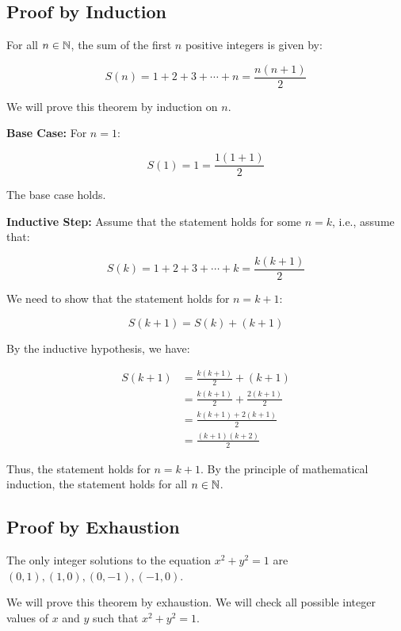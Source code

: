 \QED

\subsection{Proof by Induction}

For all \( n \in \mathbb{N} \), the sum of the first \(n\) positive integers is given by:

\[
	S(n) = 1 + 2 + 3 + \cdots + n = \frac{n(n+1)}{2}
\]

We will prove this theorem by induction on \(n\).
\vspace{\baselineskip}

\textbf{Base Case:} For \( n = 1 \):

\[
	S(1) = 1 = \frac{1(1+1)}{2}
\]

The base case holds.
\vspace{\baselineskip}

\textbf{Inductive Step:} Assume that the statement holds for some \( n = k \), i.e., assume that:
	
\[
	S(k) = 1 + 2 + 3 + \cdots + k = \frac{k(k+1)}{2}
\]
	
We need to show that the statement holds for \( n = k + 1 \):

\[
	S(k+1) = S(k) + (k + 1)
\]
	
By the inductive hypothesis, we have:

\begin{align*}
	S(k+1) &= \frac{k(k+1)}{2} + (k + 1) \\
	&= \frac{k(k+1)}{2} + \frac{2(k + 1)}{2}\\
    &= \frac{k(k+1) + 2(k + 1)}{2} \\
	&= \frac{(k + 1)(k + 2)}{2}	
\end{align*}

Thus, the statement holds for \( n = k + 1 \).
By the principle of mathematical induction, the statement holds for all \( n \in \mathbb{N} \).

\QED

\subsection{Proof by Exhaustion}

The only integer solutions to the equation \( x^2 + y^2 = 1 \) are \( (0, 1), (1, 0), (0, -1), (-1, 0) \).
\vspace{\baselineskip}

We will prove this theorem by exhaustion. We will check all possible integer values of \(x\) and 
\(y\) such that \( x^2 + y^2 = 1 \).
\vspace{\baselineskip}

